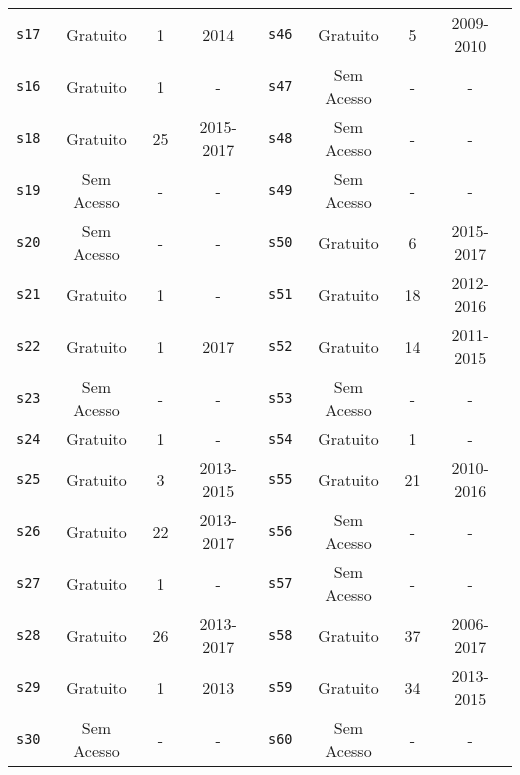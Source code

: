 \begin{longtable}{ l c c c | l c c c }
\texttt{s17} & Gratuito & 1 & 2014 & \texttt{s46} & Gratuito & 5 & 2009-2010 \\
\texttt{s16} & Gratuito & 1 & - & \texttt{s47} & Sem Acesso & - & - \\
\texttt{s18} & Gratuito & 25 & 2015-2017 & \texttt{s48} & Sem Acesso & - & - \\
\texttt{s19} & Sem Acesso & - & - & \texttt{s49} & Sem Acesso & - & - \\
\texttt{s20} & Sem Acesso & - & - & \texttt{s50} & Gratuito & 6 & 2015-2017 \\
\texttt{s21} & Gratuito & 1 & - & \texttt{s51} & Gratuito & 18 & 2012-2016 \\
\texttt{s22} & Gratuito & 1 & 2017 & \texttt{s52} & Gratuito & 14 & 2011-2015 \\
\texttt{s23} & Sem Acesso & - & - & \texttt{s53} & Sem Acesso & - & - \\
\texttt{s24} & Gratuito & 1 & - & \texttt{s54} & Gratuito & 1 & - \\
\texttt{s25} & Gratuito & 3 & 2013-2015 & \texttt{s55} & Gratuito & 21 & 2010-2016 \\
\texttt{s26} & Gratuito & 22 & 2013-2017 & \texttt{s56} & Sem Acesso & - & - \\
\texttt{s27} & Gratuito & 1 & - & \texttt{s57} & Sem Acesso & - & - \\
\texttt{s28} & Gratuito & 26 & 2013-2017 & \texttt{s58} & Gratuito & 37 & 2006-2017 \\
\texttt{s29} & Gratuito & 1 & 2013 & \texttt{s59} & Gratuito & 34 & 2013-2015 \\
\texttt{s30} & Sem Acesso & - & - & \texttt{s60} & Sem Acesso & - & - \\
\end{longtable}
